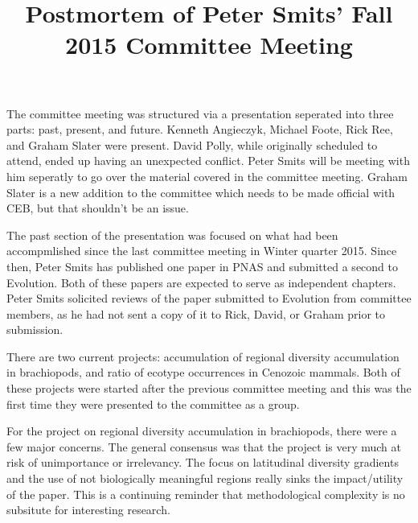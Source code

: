 \documentclass{article}
\title{Postmortem of Peter Smits' Fall 2015 Committee Meeting}
\date{}
\begin{document}
\linenumbers
\modulolinenumbers[2]

\maketitle

The committee meeting was structured via a presentation seperated into three parts: past, present, and future. Kenneth Angieczyk, Michael Foote, Rick Ree, and Graham Slater were present. David Polly, while originally scheduled to attend, ended up having an unexpected conflict. Peter Smits will be meeting with him seperatly to go over the material covered in the committee meeting. Graham Slater is a new addition to the committee which needs to be made official with CEB, but that shouldn't be an issue.

The past section of the presentation was focused on what had been accompmlished since the last committee meeting in Winter quarter 2015. Since then, Peter Smits has published one paper in PNAS and submitted a second to Evolution. Both of these papers are expected to serve as independent chapters. Peter Smits solicited reviews of the paper submitted to Evolution from committee members, as he had not sent a copy of it to Rick, David, or Graham prior to submission.

There are two current projects: accumulation of regional diversity accumulation in brachiopods, and ratio of ecotype occurrences in Cenozoic mammals. Both of these projects were started after the previous committee meeting and this was the first time they were presented to the committee as a group.

For the project on regional diversity accumulation in brachiopods, there were a few major concerns. The general consensus was that the project is very much at risk of unimportance or irrelevancy. The focus on latitudinal diversity gradients and the use of not biologically meaningful regions really sinks the impact/utility of the paper. This is a continuing reminder that methodological complexity is no subsitute for interesting research. 
\end{document}
